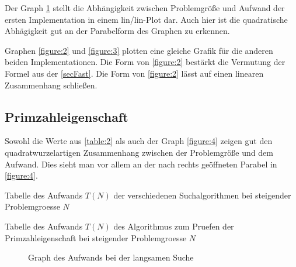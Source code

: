 \documentclass[paper=a4, fontsize=11pt]{scrartcl} %
\numberwithin{equation}{section} %
\numberwithin{figure}{section} %
\numberwithin{table}{section} %
\begin{document}
Der Graph \ref{figure:1} stellt die Abh\"angigkeit zwischen Problemgr\"o{\ss}e und
Aufwand der ersten Implementation in einem lin/lin-Plot dar. Auch hier ist die
quadratische Abh\"agigkeit gut an der Parabelform des Graphen zu erkennen.

Graphen \ref{figure:2} und \ref{figure:3} plotten eine gleiche Grafik f\"ur die
anderen beiden Implementationen. Die Form von \ref{figure:2} best\"arkt die Vermutung
der Formel aus der \ref{secFast}. Die Form von \ref{figure:2} l\"asst auf einen
linearen Zusammenhang schlie{\ss}en.

\subsection{Primzahleigenschaft}

Sowohl die Werte aus \ref{table:2} als auch der Graph \ref{figure:4} zeigen gut
den quadratwurzelartigen Zusammenhang zwischen der Problemgr\"o{\ss}e und dem Aufwand.
Dies sieht man vor allem an der nach rechts ge\"offneten Parabel in \ref{figure:4}.

\begin{table}[h]
  \centering
  \caption{Tabelle des Aufwands $T(N)$ der verschiedenen Suchalgorithmen bei
  steigender Problemgroesse $N$}
  \label{table:1}
\end{table}

\begin{table}[h]
  \centering
  \caption{Tabelle des Aufwands $T(N)$ des Algorithmus zum Pruefen der
  Primzahleigenschaft bei steigender Problemgroesse $N$}
  \label{table:2}
\end{table}

\begin{figure}[h]
  \centering
  \caption{Graph des Aufwands bei der langsamen Suche}
  \label{figure:1}
\end{figure}
\end{document}
